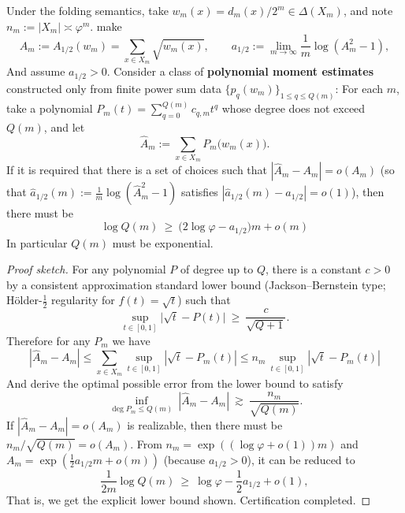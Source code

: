 \begin{proposition}\label{prop:pom-half-exponent-explicit-moment-order-lb}
Under the folding semantics, take \(w_m(x)=d_m(x)/2^m\in\Delta(X_m)\), and note \(n_m:=|X_m|\asymp \varphi^{m}\).
make
\[
A_m:=A_{1/2}(w_m)=\sum_{x\in X_m}\sqrt{w_m(x)},
\qquad
a_{1/2}:=\lim_{m\to\infty}\frac{1}{m}\log(A_m^2-1),
\]
And assume \(a_{1/2}>0\).
Consider a class of \textbf{polynomial moment estimates} constructed only from finite power sum data \(\{p_q(w_m)\}_{1\le q\le Q(m)}\):
For each \(m\), take a polynomial \(P_m(t)=\sum_{q=0}^{Q(m)}c_{q,m}t^q\) whose degree does not exceed \(Q(m)\), and let
\[
\widehat A_m:=\sum_{x\in X_m}P_m\!\bigl(w_m(x)\bigr).
\]
If it is required that there is a set of choices such that \(|\widehat A_m-A_m|=o(A_m)\) (so that \(\widehat a_{1/2}(m):=\frac1m\log(\widehat A_m^2-1)\) satisfies \(|\widehat a_{1/2}(m)-a_{1/2}|=o(1)\)),
then there must be
\[
\boxed{\;
\log Q(m)\ \ge\ \bigl(2\log\varphi-a_{1/2}\bigr)m+o(m)\;}
\]
In particular \(Q(m)\) must be exponential.
\end{proposition}
\begin{proof}[Proof sketch]
For any polynomial \(P\) of degree up to \(Q\), there is a constant \(c>0\) by a consistent approximation standard lower bound (Jackson--Bernstein type; Hölder-\(\tfrac12\) regularity for \(f(t)=\sqrt{t}\)) such that
\[
\sup_{t\in[0,1]}\bigl|\sqrt{t}-P(t)\bigr|\ \ge\ \frac{c}{\sqrt{Q+1}}.
\]
Therefore for any \(P_m\) we have
\[
|\widehat A_m-A_m|
\le
\sum_{x\in X_m}\sup_{t\in[0,1]}|\sqrt t-P_m(t)|
\le
n_m\,\sup_{t\in[0,1]}|\sqrt t-P_m(t)|
\]
And derive the optimal possible error from the lower bound to satisfy
\[
\inf_{\deg P_m\le Q(m)}\ |\widehat A_m-A_m|\ \gtrsim\ \frac{n_m}{\sqrt{Q(m)}}.
\]
If \(|\widehat A_m-A_m|=o(A_m)\) is realizable, then there must be \(n_m/\sqrt{Q(m)}=o(A_m)\).
From \(n_m=\exp((\log\varphi+o(1))m)\) and \(A_m=\exp(\frac12 a_{1/2}m+o(m))\) (because \(a_{1/2}>0\)), it can be reduced to
\[
\frac{1}{2m}\log Q(m)\ \ge\ \log\varphi-\frac12 a_{1/2}+o(1),
\]
That is, we get the explicit lower bound shown. Certification completed.
\end{proof}

